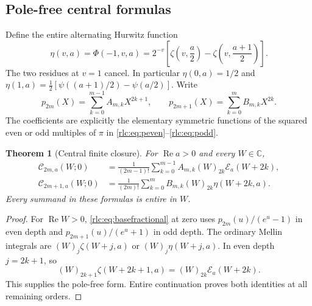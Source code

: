 \documentclass[11pt,a4paper]{article}
\numberwithin{equation}{section}
\newtheorem{theorem}{Theorem}[section]
\theoremstyle{definition}\newtheorem{definition}[theorem]{Definition}
\theoremstyle{remark}\newtheorem{remark}[theorem]{Remark}
\DeclareMathOperator{\Rea}{Re}
\newcommand{\C}{\mathbb C}\newcommand{\R}{\mathbb R}\newcommand{\N}{\mathbb N}
\newcommand{\E}{\mathcal E}
\newcommand{\CC}{\mathcal C}
\begin{document}
\subsection{Pole-free central formulas}
Define the entire alternating Hurwitz function
\begin{equation}\label{rlc:eq:eta}
 \eta(v,a)=\Phi(-1,v,a)
 =2^{-v}\left[\zeta\left(v,\frac a2\right)
                -\zeta\left(v,\frac{a+1}2\right)\right].
\end{equation}
The two residues at $v=1$ cancel. In particular
$\eta(0,a)=1/2$ and
$\eta(1,a)=\tfrac12[\psi((a+1)/2)-\psi(a/2)]$.
Write
\[
 p_{2m}(X)=\sum_{k=0}^{m-1}A_{m,k}X^{2k+1},\qquad
 p_{2m+1}(X)=\sum_{k=0}^{m}B_{m,k}X^{2k}.
\]
The coefficients are explicitly the elementary symmetric functions
of the squared even or odd multiples of $\pi$ in
\eqref{rlc:eq:peven}--\eqref{rlc:eq:podd}.

\begin{theorem}[Central finite closure]\label{rlc:thm:central}
For $\Rea a>0$ and every $W\in\C$,
\begin{align}
 \CC_{2m,a}(W;0)
 &=\frac1{(2m-1)!}\sum_{k=0}^{m-1}
       A_{m,k}(W)_{2k}\E_a(W+2k),\label{rlc:eq:evencentral}\\
 \CC_{2m+1,a}(W;0)
 &=\frac1{(2m)!}\sum_{k=0}^{m}
       B_{m,k}(W)_{2k}\eta(W+2k,a).\label{rlc:eq:oddcentral}
\end{align}
Every summand in these formulas is entire in $W$.
\end{theorem}
\begin{proof}
For $\Rea W>0$, \eqref{rlc:eq:basefractional} at zero uses
$p_{2m}(u)/(e^u-1)$ in even depth and $p_{2m+1}(u)/(e^u+1)$
in odd depth. The ordinary Mellin integrals are
$(W)_j\zeta(W+j,a)$ or $(W)_j\eta(W+j,a)$.
In even depth $j=2k+1$, so
\[
 (W)_{2k+1}\zeta(W+2k+1,a)
     =(W)_{2k}\E_a(W+2k).
\]
This supplies the pole-free form. Entire continuation proves both
identities at all remaining orders.
\end{proof}
\end{document}

